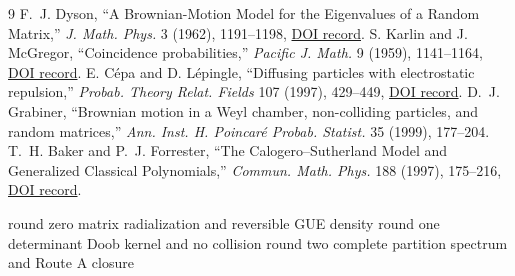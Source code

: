\documentclass[10pt]{article}
\begin{document}
\begin{thebibliography}{9}
 F.~J. Dyson, ``A Brownian-Motion Model for the Eigenvalues of
a Random Matrix,'' \emph{J. Math. Phys.} 3 (1962), 1191--1198,
\href{https://doi.org/10.1063/1.1703862}{DOI record}.
 S. Karlin and J. McGregor, ``Coincidence probabilities,''
\emph{Pacific J. Math.} 9 (1959), 1141--1164,
\href{https://doi.org/10.2140/pjm.1959.9.1141}{DOI record}.
 E. C\'epa and D. L\'epingle, ``Diffusing particles with
electrostatic repulsion,'' \emph{Probab. Theory Relat. Fields} 107 (1997),
429--449, \href{https://doi.org/10.1007/s004400050092}{DOI record}.
 D.~J. Grabiner, ``Brownian motion in a Weyl chamber,
non-colliding particles, and random matrices,'' \emph{Ann. Inst. H. Poincar\'e
Probab. Statist.} 35 (1999), 177--204.
 T.~H. Baker and P.~J. Forrester, ``The Calogero--Sutherland
Model and Generalized Classical Polynomials,'' \emph{Commun. Math. Phys.}
188 (1997), 175--216,
\href{https://doi.org/10.1007/s002200050161}{DOI record}.
\end{thebibliography}

\bigskip
\begin{center}\small\sffamily
\ifcase\CRevisionRound
round zero matrix radialization and reversible GUE density
\or
round one determinant Doob kernel and no collision
\or
round two complete partition spectrum and Route A closure
\fi
\end{center}
\end{document}
